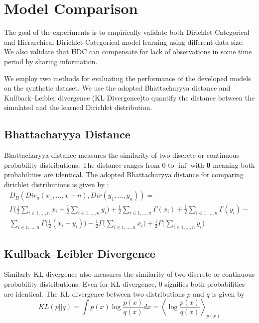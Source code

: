 \section{Model Comparison}

The goal of the experiments is to empirically validate both Dirichlet-Categorical and Hierarchical-Dirichlet-Categorical model 
learning using different data size. We also validate that HDC can compensate  for lack of observations in some time period by sharing information.

We employ two methods for evaluating the performance of the developed models on the synthetic dataset. We use the adopted Bhattacharyya distance \cite{bhattacharyya1946measure} and Kullback–Leibler divergence \cite{kullback1951information}  (KL Divergence)to quantify the distance between the simulated and the learned Dirichlet distribution.   

\subsection{Bhattacharyya Distance}
Bhattacharyya distance measures the similarity of two discrete or continuous probability distributions. The distance ranges from 0 to $\inf$ with \textbf{0} meaning both probabilities are identical. The  adopted Bhattacharyya distance \cite{rauber2008bhattacharyya} for comparing dirichlet distributions is given by :
\begin{multline}
	D_B (Dir_a (x_1, \dots ,x+n), Dir (y_1, \dots , y_n)) = \nonumber\\
	 \Gamma \Bigg ( \frac{1}{2}  \sum_{i \in {1, \dots, n}} x_i +  \frac{1}{2}\sum_{i \in {1, \dots, n}} y_i\Bigg) + 
	\frac{1}{2}  \sum_{i \in {1, \dots, n}} \Gamma  (x_i) + 
	\frac{1}{2}  \sum_{i \in {1, \dots, n}} \Gamma  (y_i) - \\ 
	\sum_{i \in {1, \dots, n}} \Gamma \bigg (\frac{1}{2}  (x_i + y_i) \bigg) - \frac{1}{2}  \Gamma \Bigg (  \sum_{i \in {1, \dots, n}} x_i \Bigg) + \frac{1}{2}  \Gamma \Bigg ( \sum_{i \in {1, \dots, n}} y_i\Bigg)
\end{multline}

\subsection{Kullback–Leibler Divergence}
Similarly KL divergence also measures the similarity of two discrete or continuous probability distributions. Even for KL divergence, 0 signifies both probabilities are identical.  
The KL divergence between two distributions $p$ and $q$ is given by
\begin{equation*}
	KL (p||q) = \int p (x) \log \frac{p (x)}{q (x)} dx = \left < \log \frac{p (x)}{q (x)}  \right>_{p (x)}
\end{equation*}


